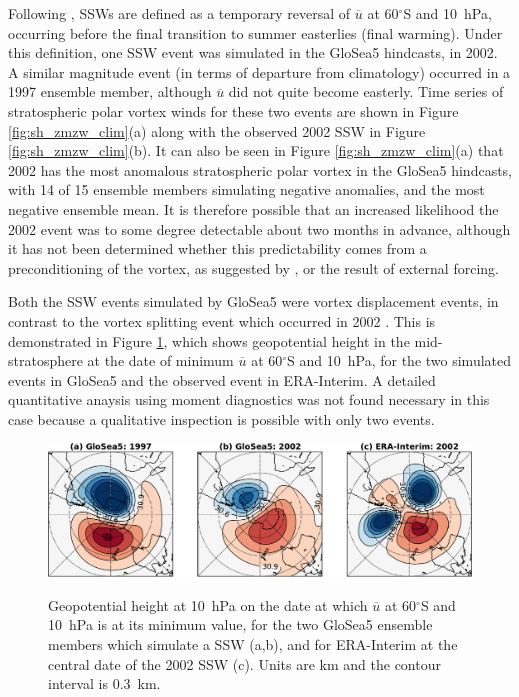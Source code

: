 Following \citet{Charlton2007a}, SSWs are defined as a temporary reversal of
$\overline{u}$ at 60$^{\circ}$S and 10~hPa, occurring before the final
transition to summer easterlies (final warming). Under this definition, one SSW
event was simulated in the GloSea5 hindcasts, in 2002. A similar magnitude event
(in terms of departure from climatology) occurred in a 1997 ensemble member,
although $\overline{u}$ did not quite become easterly. Time series of
stratospheric polar vortex winds for these two events are shown in Figure
\ref{fig:sh_zmzw_clim}(a) along with the observed 2002 SSW in Figure
\ref{fig:sh_zmzw_clim}(b). It can also be seen in Figure
\ref{fig:sh_zmzw_clim}(a) that 2002 has the most anomalous stratospheric polar
vortex in the GloSea5 hindcasts, with 14 of 15 ensemble members simulating
negative anomalies, and the most negative ensemble mean. It is therefore
possible that an increased likelihood the 2002 event was to some degree
detectable about two months in advance, although it has not been determined
whether this predictability comes from a preconditioning of the vortex, as
suggested by \citet{Scaife2005c}, or the result of external forcing.

Both the SSW events simulated by GloSea5 were vortex displacement events, in
contrast to the vortex splitting event which occurred in 2002
\citep{Charlton2005a}. This is demonstrated in Figure \ref{fig:sh_ssws}, which
shows geopotential height in the mid-stratosphere at the date of minimum
$\overline{u}$ at 60$^{\circ}$S and 10~hPa, for the two simulated events in
GloSea5 and the observed event in ERA-Interim. A detailed quantitative anaysis
using moment diagnostics was not found necessary in this case because a
qualitative inspection is possible with only two events.

\begin{figure}[t]
  \noindent\includegraphics[width=\textwidth,angle=0]{figures/chapter-seasonal/ssws_crop.pdf}\\
  \caption[Comparison of GloSea5 and observed SSWs.]{Geopotential height at
    10~hPa on the date at which $\overline{u}$ at 60$^{\circ}$S and 10~hPa is at
    its minimum value, for the two GloSea5 ensemble members which simulate a SSW
    (a,b), and for ERA-Interim at the central date of the 2002 SSW (c). Units
    are km and the contour interval is 0.3~km.}\label{fig:sh_ssws}
\end{figure}

